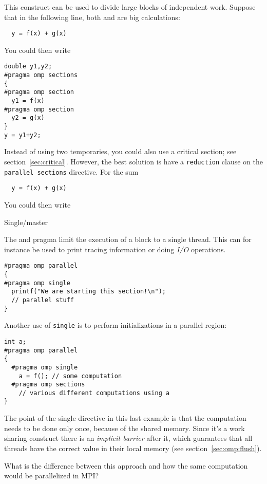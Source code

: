 This construct can be used to divide large blocks of independent work.
Suppose that in the following line, both  and 
are big calculations:
\begin{lstlisting}
  y = f(x) + g(x)
\end{lstlisting}
You could then write
\begin{lstlisting}
double y1,y2;
#pragma omp sections
{
#pragma omp section
  y1 = f(x)
#pragma omp section
  y2 = g(x)
}
y = y1+y2;
\end{lstlisting}
Instead of using two temporaries, you could also use a critical
section; see section~\ref{sec:critical}.  However, the best solution
is have a \lstinline{reduction} clause on the \lstinline{parallel sections} directive.
For the sum
\begin{lstlisting}
  y = f(x) + g(x)
\end{lstlisting}
You could then write

 {Single/master}
\label{sec:omp-single}

The  and  pragma
limit the execution of a block to a single thread. 
This can for instance be used to print tracing information
or doing \emph{I/O} operations.
\begin{lstlisting}
#pragma omp parallel
{
#pragma omp single
  printf("We are starting this section!\n");
  // parallel stuff
}
\end{lstlisting}
Another use of \lstinline{single} is to perform initializations
in a parallel region:
\begin{lstlisting}
int a;
#pragma omp parallel
{
  #pragma omp single
    a = f(); // some computation
  #pragma omp sections
    // various different computations using a
}
\end{lstlisting}

The point of the single directive in this last example is that the
computation needs to be done only once, because of the shared memory.
Since it's a work sharing construct there is an \emph{implicit
  barrier} after it,
which guarantees that all threads have the correct value in their
local memory (see section~\ref{sec:omp:flush}).

\begin{exercise}
  \label{ex:omp-single-mpi}
  What is the difference between this approach and how the same
  computation would be parallelized in MPI?
\end{exercise}


